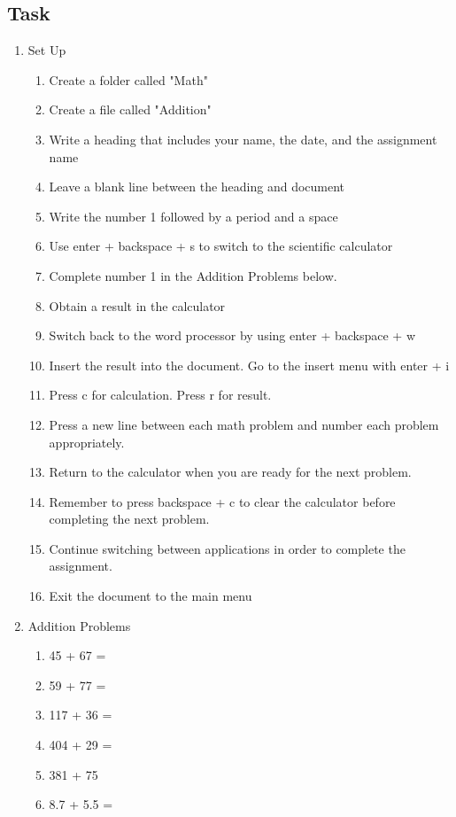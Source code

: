 \documentclass[10pt,letterpaper,twoside]{report}
\begin{document}
{{\subsection{Task}
\begin{enumerate}
	\item Set Up
	      \begin{enumerate}
		      \item Create a folder called "Math"
		      \item Create a file called "Addition"
		      \item Write a heading that includes your name, the date, and the assignment name
		      \item Leave a blank line between the heading and document
		      \item Write the number 1 followed by a period and a space
		      \item Use enter + backspace + s to switch to the scientific calculator
		      \item Complete number 1 in the Addition Problems below.
		      \item Obtain a result in the calculator
		      \item Switch back to the word processor by using enter + backspace + w
		      \item Insert the result into the document. Go to the insert menu with enter + i
		      \item Press c for calculation. Press r for result.
		      \item Press a new line between each math problem and number each problem appropriately.
		      \item Return to the calculator when you are ready for the next problem.
		      \item Remember to press backspace + c to clear the calculator before completing the next problem.
		      \item Continue switching between applications in order to complete the assignment.
		      \item Exit the document to the main menu
	      \end{enumerate}
	\item Addition Problems
	      \begin{enumerate}
		      \item 45 + 67 =
		      \item 59 + 77 =
		      \item 117 + 36 =
		      \item 404 + 29 =
		      \item 381 + 75
		      \item 8.7 + 5.5 =
	      \end{enumerate}
\end{enumerate}
\clearpage
}}
\end{document}
